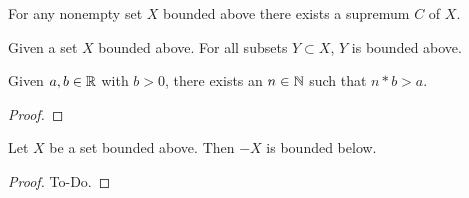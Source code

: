 \begin{axiom}\label{ax:complax}
   \leanok
  For any nonempty set $X$ bounded above there exists a supremum $C$ of $X$.
\end{axiom}

\begin{lemma}\label{lem:subsetboundbounded}
   \leanok
  Given a set $X$ bounded above.
  For all subsets $Y \subset X$,
  $Y$ is bounded above.
\end{lemma}

\begin{theorem}[Archimedes]\label{thm:archimedes}
  Given $a, b \in \mathbb{R}$ with $b > 0$,
  there exists an $n \in \mathbb{N}$ such that $n * b > a$.
\end{theorem}
\begin{proof}
\end{proof}

\begin{lemma}\label{lem:setboundabve_neg_boundbelow}
   \leanok
  Let $X$ be a set bounded above.
  Then $-X$ is bounded below.
\end{lemma}
\begin{proof}
  To-Do.
\end{proof}

